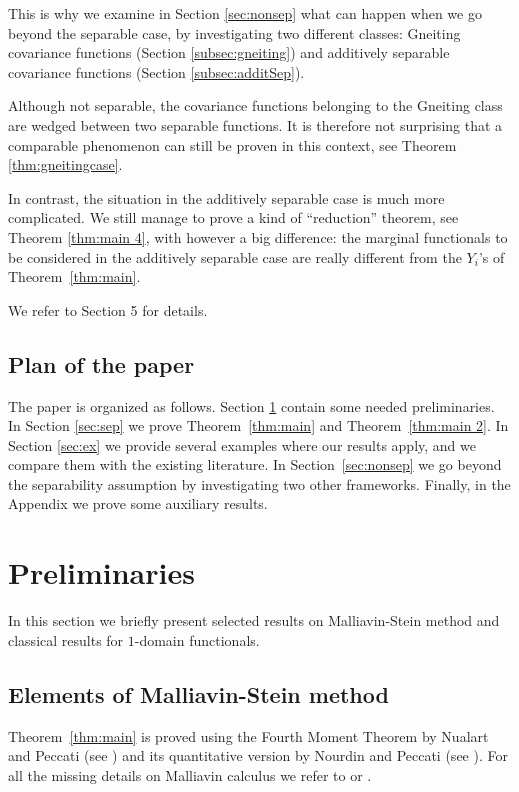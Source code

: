 \documentclass[12pt]{article}
\DeclareMathOperator{\1}{1}
\theoremstyle{plain}
\theoremstyle{definition}
\begin{document}
This is why we examine in Section \ref{sec:nonsep} what can happen when we go beyond the separable case,
by investigating two different classes: Gneiting covariance functions (Section \ref{subsec:gneiting}) and additively separable covariance functions (Section \ref{subsec:additSep}).



Although not separable, the covariance functions belonging to the Gneiting class are wedged between two separable functions.
It is therefore not surprising that a comparable phenomenon can still be proven in this context, see Theorem \ref{thm:gneitingcase}.

In contrast, the situation in the additively separable case is much more complicated. We still manage to prove a kind of ``reduction'' theorem, see Theorem \ref{thm:main 4}, with however a big difference: the marginal functionals to be considered in the additively separable case are really different from the $Y_i$'s of Theorem~\ref{thm:main}.

We refer to Section 5 for details.

\subsection{Plan of the paper} 
    The paper is organized as follows. Section \ref{sec:prel} contain some needed preliminaries. In Section \ref{sec:sep} we prove Theorem~\ref{thm:main} and Theorem~\ref{thm:main 2}.  In Section \ref{sec:ex} we provide several examples where our results apply, and we compare them with the existing literature. In Section~\ref{sec:nonsep} we go beyond the separability assumption by investigating two other frameworks. Finally, in the Appendix we prove some auxiliary results.

\section{Preliminaries}\label{sec:prel}

In this section we briefly present selected results on Malliavin-Stein method and classical results for $1$-domain functionals. 

\subsection{Elements of Malliavin-Stein method}
\label{subsec:prelmalliavin}
Theorem~\ref{thm:main} is proved using the Fourth Moment Theorem by Nualart and Peccati (see \cite{cltNuaPec}) and its quantitative version by Nourdin and Peccati (see \cite[Theorem 5.2.6]{bluebook}). For all the missing details on Malliavin calculus we refer to  \cite{nualart2006malliavin} or \cite{bluebook}.
\end{document}
